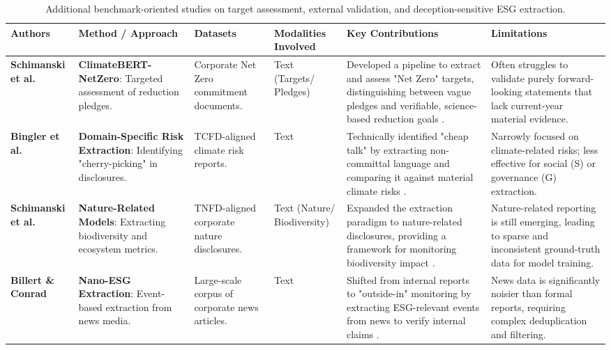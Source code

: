 \begin{landscape}
\begin{table}[p]
\centering
\caption{Additional benchmark-oriented studies on target assessment, external validation, and deception-sensitive ESG extraction.}
\label{tab:relatedwork-hallucination-grounding-b}
\small
\renewcommand{\arraystretch}{1.2}
\begin{tabularx}{\linewidth}{|p{1.8cm}|p{3.5cm}|p{2.5cm}|p{1.8cm}|X|X|}
\hline
Authors & Method / Approach & Datasets & Modalities Involved & Key Contributions & Limitations \\ \hline
\textbf{Schimanski et al.}  \parencite{tobias_schimanski_241ada20} & \textbf{ClimateBERT-NetZero}: Targeted assessment of reduction pledges. & Corporate Net Zero commitment documents. & Text (Targets/ Pledges) & Developed a pipeline to extract and assess "Net Zero" targets, distinguishing between vague pledges and verifiable, science-based reduction goals  \parencite{tobias_schimanski_241ada20}. & Often struggles to validate purely forward-looking statements that lack current-year material evidence. \\ \hline
\textbf{Bingler et al.}  \parencite{julia_bingler_268445e3} & \textbf{Domain-Specific Risk Extraction}: Identifying "cherry-picking" in disclosures. & TCFD-aligned climate risk reports. & Text & Technically identified "cheap talk" by extracting non-committal language and comparing it against material climate risks  \parencite{julia_bingler_268445e3}. & Narrowly focused on climate-related risks; less effective for social (S) or governance (G) extraction. \\ \hline
\textbf{Schimanski et al.}  \parencite{tobias_schimanski_3549ff9f} & \textbf{Nature-Related Models}: Extracting biodiversity and ecosystem metrics. & TNFD-aligned corporate nature disclosures. & Text (Nature/ Biodiversity) & Expanded the extraction paradigm to nature-related disclosures, providing a framework for monitoring biodiversity impact  \parencite{tobias_schimanski_3549ff9f}. & Nature-related reporting is still emerging, leading to sparse and inconsistent ground-truth data for model training. \\ \hline
\textbf{Billert \& Conrad}  \parencite{fabian_billert_a5fbb687} & \textbf{Nano-ESG Extraction}: Event-based extraction from news media. & Large-scale corpus of corporate news articles. & Text & Shifted from internal reports to "outside-in" monitoring by extracting ESG-relevant events from news to verify internal claims  \parencite{fabian_billert_a5fbb687}. & News data is significantly noisier than formal reports, requiring complex deduplication and filtering. \\ \hline

\end{tabularx}
\end{table}
\end{landscape}
